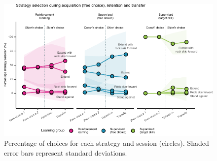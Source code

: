 \documentclass[pdflatex,sn-nature]{sn-jnl}%
\theoremstyle{thmstyleone}%
\theoremstyle{thmstyletwo}%
\theoremstyle{thmstylethree}%
\begin{document}
\begin{figure}[H]
\centering
\includegraphics{figures/figure_choice_descriptivecount_5.pdf}
\caption{Percentage of choices for each strategy and session (circles). Shaded error bars represent standard deviations. }\label{fig: choice_descriptives}
\end{figure}
\end{document}
